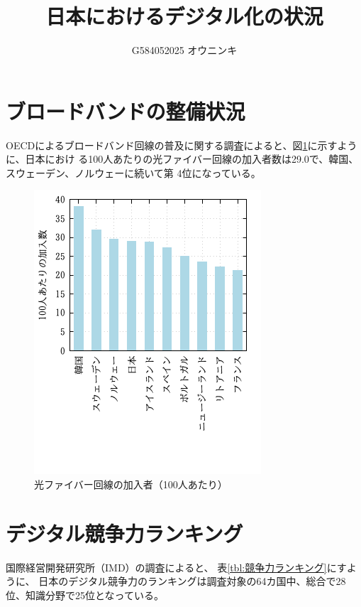 \documentclass[a4paper,11pt,dvipdfmx]{ujarticle}
\title{日本におけるデジタル化の状況}
\author{G584052025 オウニンキ}
\begin{document}
\maketitle


\section{ブロードバンドの整備状況}

OECDによるブロードバンド回線の普及に関する調査\cite{oecd}によると、図\ref{fig:加入者}に示すように、日本におけ
る100人あたりの光ファイバー回線の加入者数は29.0で、韓国、スウェーデン、ノルウェーに続いて第
4位になっている。



\begin{figure}[htbp]
    \centering
    \includegraphics{fig11.png}
    \caption{光ファイバー回線の加入者（100人あたり）}\label{fig:加入者}
\end{figure}


\section{デジタル競争力ランキング}

国際経営開発研究所（IMD）の調査\cite{imd}によると、
表\ref{tbl:競争力ランキング}にすように、
日本のデジタル競争力のランキングは調査対象の64カ国中、総合で28位、知識分野で25位となっている。
\end{document}
